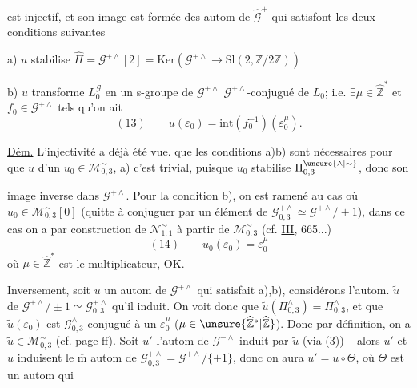 est injectif, et son image est formée des
autom de $\widehat{\mathcal{G}}^{+}$ qui satisfont les deux
conditions suivantes

a) $u$ stabilise $\widehat{\Pi}=\mathcal{G}^{+\wedge}[2]
=\mathrm{Ker}(\mathcal{G}^{+\wedge}\longrightarrow\mathrm{Sl}(2,\mathbb{Z}/2\mathbb{Z}))$

b) $u$ transforme $L_{0}^{\mathcal{G}}$ en un s-groupe de $\mathcal{G}^{+\wedge}$
$\mathcal{G}^{+\wedge}$-conjugué de $L_{0}$; i.e.
$\exists\mu\in\widehat{\mathbb{Z}}^{*}$ et $f_{0}\in\mathcal{G}^{+\wedge}$
tels qu'on ait
\[
(13)\qquad u(\varepsilon_{0})=\mathrm{int}(f_{0}^{-1})(\varepsilon_{0}^{\mu}).
\]

\uline{Dém.} L'injectivité a déjà été vue.
que les conditions a)b) sont nécessaires pour
que $u$ 
d'un $u_{0}\in\mathcal{M}_{0,3}^{\sim}$,
 a) c'est trivial, puisque $u_{0}$ stabilise
$\Pi_{0,3}^{\unsure{\wedge|\sim}}$, donc son




image inverse dans $\mathcal{G}^{+\wedge}$. Pour la condition
b), on est ramené au cas où $u_{0}\in\mathcal{M}_{0,3}^{\sim}[0]$
(quitte à conjuguer par un élément de
$\mathcal{G}_{0,3}^{+\wedge}\simeq\mathcal{G}^{+\wedge}/\!\pm1$),
dans ce cas on a par construction de $\mathcal{N}_{1,1}^{\sim}$ à partir
de $\mathcal{M}_{0,3}^{\sim}$ (cf. \uline{III},  665...)
\[
(14)\qquad u_{0}(\varepsilon_{0})=\varepsilon_{0}^{\mu}
\]
où $\mu\in\widehat{\mathbb{Z}}^{*}$ est le multiplicateur, OK.

Inversement, soit $u$ un autom de $\mathcal{G}^{+\wedge}$ qui
satisfait a),b), considérons l'autom. $\widetilde{u}$ de
$\mathcal{G}^{+\wedge}/\!\pm1\simeq\mathcal{G}_{0,3}^{+\wedge}$
qu'il induit. On voit donc
que $\widetilde{u}(\Pi_{0,3}^{\wedge})=\Pi_{0,3}^{\wedge}$, et que
$\widetilde{u}(\varepsilon_{0})$ est $\mathcal{G}_{0,3}^{\wedge}$-conjugué
à un $\varepsilon_{0}^{\mu}$ ($\mu\in\unsure{\widehat{\mathbb{Z}}^{*}|\widehat{\mathbb{Z}}}$).
 Donc par
définition, on a $\widetilde{u}\in\mathcal{M}_{0,3}^{\sim}$
(cf. page  ff).
Soit $u'$ l'autom de $\mathcal{G}^{+\wedge}$ induit par $\widetilde{u}$
(via (3)) -- alors $u'$ et $u$ induisent le $\overline{\mathrm m}$
autom de $\mathcal{G}_{0,3}^{+\wedge}=\mathcal{G}^{+\wedge}/\{\pm1\}$,
donc on aura $u'=u\circ\Theta$, où
$\Theta$ est un autom qui

